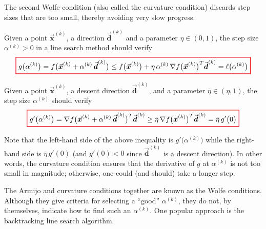 \documentclass[9pt, headings=standardclasses, parskip=half]{scrartcl}
\renewcommand{\emph}[1]{\textcolor{mypurple}{#1}}
\newcommand{\vect}[1]{\vec{\boldsymbol{#1}}}
\begin{document}
The second Wolfe condition (also called the \emph{curvature condition}) discards step sizes that are too small, thereby avoiding very slow progress.

\begin{definition}
\label{def:first_wolfe_condition}
Given a point \(\vect{x}^{(k)}\), a direction \(\vect{d}^{(k)}\) and a parameter \(\eta \in (0,1)\), the step size \(\alpha^{(k)}>0\) in a line search method should verify
\begin{equation}
\label{eq:first_wolfe_condition}
{\color{Red}
\setlength{\fboxrule}{1pt}
\boxed{ 
\color{black}
g\bigl(\alpha^{(k)}\bigr) 
=
f\bigl(\vect{x}^{(k)} + \alpha^{(k)}\,\vect{d}^{(k)}\bigr) 
\le 
f\bigl(\vect{x}^{(k)}\bigr) + \eta\, \alpha^{(k)}\, \nabla f\bigl(\vect{x}^{(k)}\bigr)^T \vect{d}^{(k)} 
= 
\ell\bigl(\alpha^{(k)}\bigr) %
}
}
\end{equation}
\end{definition}

\begin{definition}
\label{def:second_wolfe_condition}
Given a point \(\vect{x}^{(k)}\), a descent direction \(\vect{d}^{(k)}\), and a parameter \(\bar{\eta} \in (\eta, 1)\), the step size \(\alpha^{(k)}\) should verify
\begin{equation}
\label{eq:second_wolfe_condition}
{\color{Red}
\setlength{\fboxrule}{1pt}
\boxed{ 
\color{black}
g'\bigl(\alpha^{(k)}\bigr) 
= 
\nabla f\bigl(\vect{x}^{(k)} + \alpha^{(k)}\,\vect{d}^{(k)}\bigr)^T \vect{d}^{(k)} 
\ge 
\bar{\eta}\, \nabla f\bigl(\vect{x}^{(k)}\bigr)^T \vect{d}^{(k)}
=
\bar{\eta}\,g'\bigl(0\bigr)
}
}
\end{equation}
\end{definition}

Note that the left-hand side of the above inequality is \(g'\bigl(\alpha^{(k)}\bigr)\) while the right-hand side is \(\bar{\eta}\,g'(0)\) (and \(g'(0) < 0\) since \(\vect{d}^{(k)}\) is a descent direction). In other words, the curvature condition ensures that the derivative of \(g\) at \(\alpha^{(k)}\) is not too small in magnitude; otherwise, one could (and should) take a longer step.

The Armijo and curvature conditions together are known as the \emph{Wolfe conditions}. Although they give criteria for selecting a “good” \(\alpha^{(k)}\), they do not, by themselves, indicate how to find such an \(\alpha^{(k)}\). One popular approach is the backtracking line search algorithm.
\end{document}
